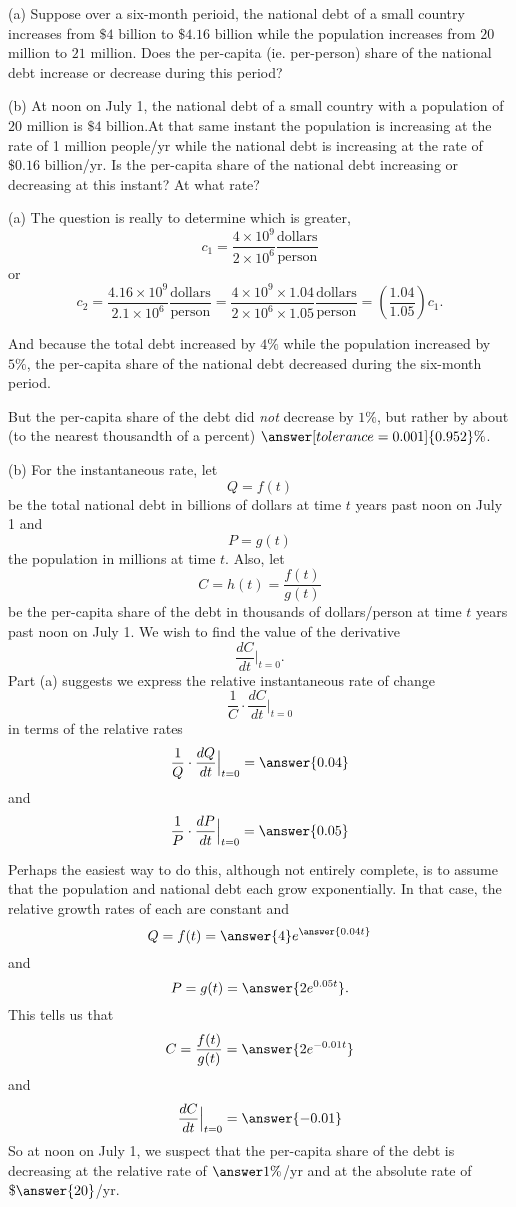 \documentclass{ximera}
\begin{document}
\begin{question} \label{Ex:Dfggt4ttggg}
(a) Suppose over a six-month perioid, the national debt of a small country increases from $\$4$ billion to $\$4.16$ billion while the population increases from $20$ million to $21$ million. Does the per-capita (ie. per-person) share of the national debt increase or decrease during this period? 

(b) At noon on July 1, the national debt of a small country with a population of $20$ million is $\$4$ billion.At that same instant the population is increasing at the rate of 1 million people/yr while the national debt is increasing at the rate of $\$0.16$ billion/yr. Is the per-capita share of the national debt increasing or decreasing at this instant? At what rate?

\begin{explanation}
(a) The question is really to determine which is greater, 
\[
       c_1 =  \frac{4 \times 10^9}{2 \times 10^6} \frac{\text{dollars}}{\text{person}}
\]
or
\[
      c_2 =   \frac{4.16 \times 10^9}{2.1 \times 10^6} \frac{\text{dollars}}{\text{person}} = \frac{4 \times 10^9 \times 1.04}{2 \times 10^6\times 1.05} \frac{\text{dollars}}{\text{person}} = \left( \frac{1.04}{1.05} \right)c_1 .
\]

And because the total debt increased by $4\%$ while the population increased by $5\%$, the per-capita share of the national debt decreased during the six-month period.

But the per-capita share of the debt did \emph{not} decrease by $1\%$, but rather by about (to the nearest thousandth of a percent) $\answer[tolerance=0.001]{0.952}\%$.

(b) For the instantaneous rate, let
\[
         Q = f(t)
\]
be the total national debt in billions of dollars at time $t$ years past noon on July 1 and
\[
     P = g(t)
\]
the population in millions at time $t$. Also, let
\[
       C = h(t) = \frac{f(t)}{g(t)}
\]
be the per-capita share of the debt in thousands of dollars/person at time $t$ years past noon on July 1. We wish to find the value of the derivative
\[
      \frac{dC}{dt} \Big|_{t=0} .
\]
Part (a) suggests we express the relative instantaneous rate of change
\[
     \frac{1}{C} \cdot \frac{dC}{dt} \Big|_{t=0}
\]
in terms of the relative rates
\[
    \frac{1}{Q} \cdot \frac{dQ}{dt}\Big|_{t=0} = \answer{0.04} 
\]
and
\[
   \frac{1}{P} \cdot \frac{dP}{dt}\Big|_{t=0} = \answer{0.05}
\]

Perhaps the easiest way to do this, although not entirely complete, is to assume that the population and national debt each grow exponentially. In that case, the relative growth rates of each are constant and 
\[
    Q = f(t) = \answer{4}e^{\answer{0.04t}}
\]
and 
\[
      P = g(t) = \answer{2e^{0.05t}} .
\]
This tells us that
\[
       C = \frac{f(t)}{g(t)} = \answer{2e^{-0.01t}}
\]
and
\[
        \frac{dC}{dt} \Big|_{t=0} = \answer{-0.01} 
\]
So at noon on July 1, we suspect that the per-capita share of the debt is decreasing at the relative rate of $\answer{1\%}$/yr
and at the absolute rate of $\$\answer{20}$/yr.


\end{explanation}
\end{question}
\end{document}
